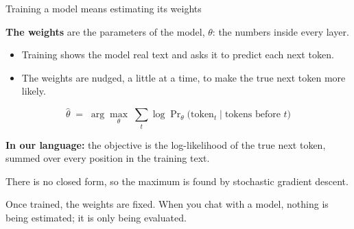 \documentclass[aspectratio=169,11pt]{beamer}
\begin{document}
\begin{frame}{Training a model means estimating its weights}

\textbf{The weights} are the parameters of the model, $\theta$: the numbers inside every layer.

\vspace{0.15cm}

\begin{itemize}\setlength\itemsep{0.25em}
    \item Training shows the model real text and asks it to predict each next token.
    \item The weights are nudged, a little at a time, to make the true next token more likely.
\end{itemize}

\vspace{-0.1cm}
\[
\hat{\theta} \;=\; \arg\max_{\theta}\; \sum_{t} \log \Pr\nolimits_{\theta}\big(\text{token}_t \mid \text{tokens before } t\big)
\]

\textbf{In our language:} the objective is the log-likelihood of the true next token, summed over every position in the training text.

\vspace{0.15cm}

There is no closed form, so the maximum is found by stochastic gradient descent.

\vspace{0.2cm}

\alert{Once trained, the weights are fixed. When you chat with a model, nothing is being estimated; it is only being evaluated.}

\end{frame}
\end{document}
